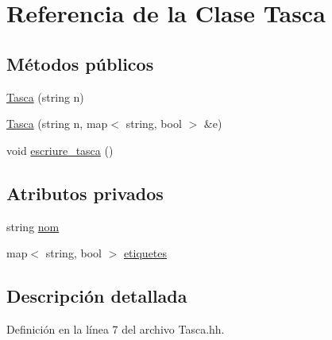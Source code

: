 \hypertarget{class_tasca}{\section{Referencia de la Clase Tasca}
\label{class_tasca}
}
\subsection*{Métodos públicos}
\begin{DoxyCompactItemize}
\item 
\hyperlink{class_tasca_a67cd792d19dc4073a940e4d8aa1eea36}{Tasca} (string n)
\item 
\hyperlink{class_tasca_a0ecdf23fc047a638e66206941343da06}{Tasca} (string n, map$<$ string, bool $>$ \&e)
\item 
void \hyperlink{class_tasca_a51a117cee6a0bed1d96e8a890cd42722}{escriure\-\_\-tasca} ()
\end{DoxyCompactItemize}
\subsection*{Atributos privados}
\begin{DoxyCompactItemize}
\item 
string \hyperlink{class_tasca_a3b35e7db0f140bc6926c321dc5cbe330}{nom}
\item 
map$<$ string, bool $>$ \hyperlink{class_tasca_a02e6c83bd74e95523e8ef9f47b18fa40}{etiquetes}
\end{DoxyCompactItemize}


\subsection{Descripción detallada}


Definición en la línea 7 del archivo Tasca.\-hh.



